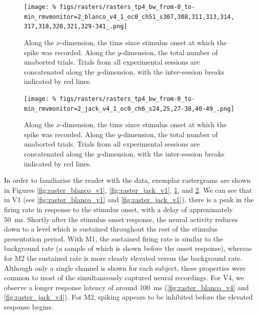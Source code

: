 \begin{figure}[p]
    \centering
    \texttt{[image: \%
figs/rasters/rasters\_tp4\_bw\_from-0\_to-min\_rmvmonitor=2\_blanco\_v4\_1\_oc0\_ch51\_s307,308,311,313,314,317,318,320,321,329-341\_.png]}
    \caption{
    Along the $x$-dimension, the time since stimulus onset at which the spike was recorded.
    Along the $y$-dimension, the total number of unaborted trials.
    Trials from all experimental sessions are concatenated along the $y$-dimension, with the inter-session breaks indicated by red lines.
}
    \label{fig:raster_blanco_v4}
\end{figure}


\begin{figure}[p]
    \centering
    \texttt{[image: \%
figs/rasters/rasters\_tp4\_bw\_from-0\_to-min\_rmvmonitor=2\_jack\_v4\_1\_oc0\_ch6\_s24,25,27-38,40-49\_.png]}
    \caption{
    Along the $x$-dimension, the time since stimulus onset at which the spike was recorded.
    Along the $y$-dimension, the total number of unaborted trials.
    Trials from all experimental sessions are concatenated along the $y$-dimension, with the inter-session breaks indicated by red lines.
}
    \label{fig:raster_jack_v4}
\end{figure}


In order to familiarise the reader with the data, exemplar rastergrams are shown in Figures \ref{fig:raster_blanco_v1}, \ref{fig:raster_jack_v1}, \ref{fig:raster_blanco_v4}, and \ref{fig:raster_jack_v4}.
We can see that in \ac{V1} (see \autoref{fig:raster_blanco_v1} and \autoref{fig:raster_jack_v1}), there is a peak in the firing rate in response to the stimulus onset, with a delay of approximately \SI{50}{\milli\second}.
Shortly after the stimulus onset response, the neural activity reduces down to a level which is sustained throughout the rest of the stimulus presentation period.
With \ac{M1}, the sustained firing rate is similar to the background rate (a sample of which is shown before the onset response), whereas for \ac{M2} the sustained rate is more clearly elevated versus the background rate.
Although only a single channel is shown for each subject, these properties were common to most of the simultaneously captured neural recordings.
For \ac{V4}, we observe a longer response latency of around \SI{100}{\milli\second} (\autoref{fig:raster_blanco_v4} and \autoref{fig:raster_jack_v4}).
For \ac{M2}, spiking appears to be inhibited before the elevated response begins.

